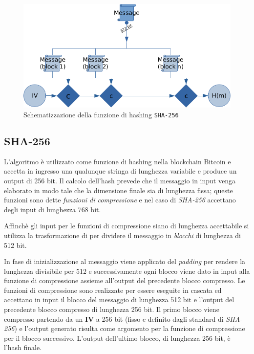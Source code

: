 \begin{figure}[H]
    \centering
    \includegraphics[scale=0.8]{images/sha256.png}
    \caption{Schematizzazione della funzione di hashing \texttt{SHA-256}}
\end{figure}

\subsection{SHA-256}
L'algoritmo  è utilizzato come funzione di hashing nella blockchain Bitcoin e accetta in ingresso una qualunque stringa di lunghezza variabile e produce un output di 256 bit.\newline
Il calcolo dell'hash prevede che il messaggio in input venga elaborato in modo tale che la dimensione finale sia di lunghezza fissa; queste funzioni sono dette \textit{funzioni di compressione} e nel caso di \textit{SHA-256} accettano degli input di lunghezza 768 bit.

Affinchè gli input per le funzioni di compressione siano di lunghezza accettabile si utilizza la trasformazione di  per dividere il messaggio in \textit{blocchi} di lunghezza di 512 bit.

In fase di inizializzazione al messaggio viene applicato del \textit{padding} per rendere la lunghezza divisibile per 512 e successivamente ogni blocco viene dato in input alla funzione di compressione assieme all'output del precedente blocco compresso. Le funzioni di compressione sono realizzate per essere eseguite in cascata ed accettano in input il blocco del messaggio di lunghezza 512 bit e l'output del precedente blocco compresso di lunghezza 256 bit.\newline
Il primo blocco viene compresso partendo da un  \textbf{IV} a 256 bit (fisso e definito dagli standard di \textit{SHA-256}) e l'output generato risulta come argomento per la funzione di compressione per il blocco successivo. L'output dell'ultimo blocco, di lunghezza 256 bit, è l'hash finale.

